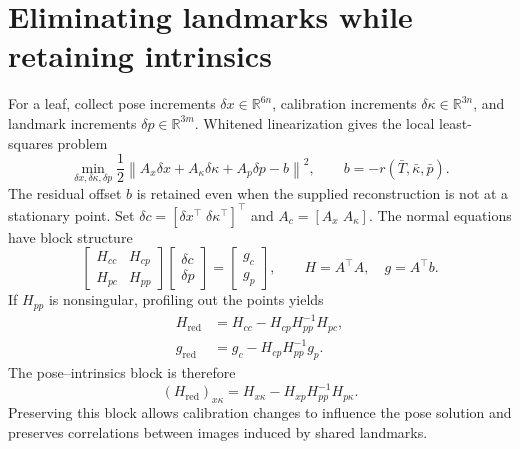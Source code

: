 \documentclass[11pt,letterpaper]{article}
\newcommand{\R}{\mathbb{R}}
\begin{document}
\section{Eliminating landmarks while retaining intrinsics}
For a leaf, collect pose increments $\delta x\in\R^{6n}$, calibration increments
$\delta\kappa\in\R^{3n}$, and landmark increments $\delta p\in\R^{3m}$.
Whitened linearization gives the local least-squares problem
\begin{equation}\label{eq:linear}
 \min_{\delta x,\delta\kappa,\delta p}
 \frac12\left\|A_x\delta x+A_\kappa\delta\kappa+A_p\delta p-b\right\|^2,
 \qquad b=-r(\bar T,\bar\kappa,\bar p).
\end{equation}
The residual offset $b$ is retained even when the supplied reconstruction is not
at a stationary point. Set $\delta c=[\delta x^\top\;\delta\kappa^\top]^\top$
and $A_c=[A_x\;A_\kappa]$. The normal equations have block structure
\begin{equation}
 \begin{bmatrix}H_{cc}&H_{cp}\\H_{pc}&H_{pp}\end{bmatrix}
 \begin{bmatrix}\delta c\\\delta p\end{bmatrix}
 =\begin{bmatrix}g_c\\g_p\end{bmatrix},\qquad
 H=A^\top A,\quad g=A^\top b.
\end{equation}
If $H_{pp}$ is nonsingular, profiling out the points yields
\begin{align}
 H_{\mathrm{red}}&=H_{cc}-H_{cp}H_{pp}^{-1}H_{pc},\label{eq:schur}\\
 g_{\mathrm{red}}&=g_c-H_{cp}H_{pp}^{-1}g_p.\label{eq:linear-term}
\end{align}
The pose--intrinsics block is therefore
\begin{equation}
 (H_{\mathrm{red}})_{x\kappa}
 =H_{x\kappa}-H_{xp}H_{pp}^{-1}H_{p\kappa}.
\end{equation}
Preserving this block allows calibration changes to influence the pose solution
and preserves correlations between images induced by shared landmarks.
\end{document}
